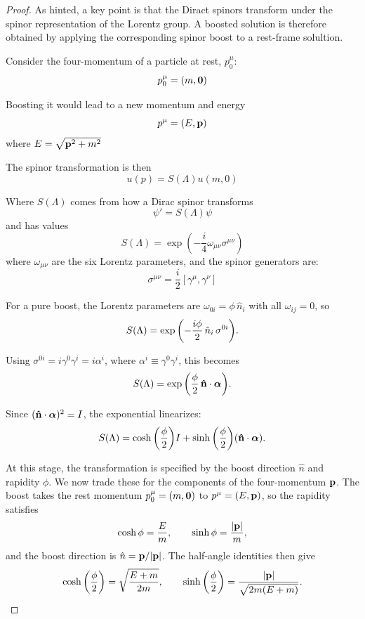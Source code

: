 \documentclass[12pt,a4paper]{article}
\begin{document}
	\begin{solution_pset}
		\begin{proof}
			\nocite{flores2026}
			As hinted, a key point is that the Diract spinors 
			transform under the spinor representation of the Lorentz
			group. A boosted solution is therefore obtained by applying 
			the corresponding spinor boost to a rest-frame solultion.

			Consider the four-momentum of a particle at rest, $p_0^\mu$:
			\begin{equation}
				\label{eq:4p-rest}
				p_0^\mu = (m,\vb{0})
			\end{equation}
			
			Boosting it would lead to a new momentum and energy
			\begin{equation}
				\label{eq:4p-moving}
				p^\mu = (E, \vb{p})
			\end{equation}
			where $E = \sqrt{\vb{p}^2 + m^2}$

			The spinor transformation is then 
			\begin{equation}
				\label{eq:spinor-transformation}
				u(p) = S(\Lambda) u(m,0)
			\end{equation}

			Where $S(\Lambda)$ comes from how a Dirac spinor transforms
			\[
				\psi' = S(\Lambda)\psi
			\]
			and has values 
			\[
				S(\Lambda) = \exp(
					- \frac{i}{4}\omega_{\mu\nu}\sigma^{\mu\nu} 
				)
			\]
			where $\omega_{\mu\nu}$ are the six Lorentz parameters, and the spinor generators are:
			\[
				\sigma^{\mu\nu} = \frac{i}{2}[\gamma^\mu,\gamma^\nu] 
			\]

			For a pure boost, the Lorentz parameters are
			$\omega_{0i} = \phi\,\hat{n}_i$ with all $\omega_{ij} = 0$,
			so
			\[
				S(\Lambda)
				=
				\exp\pqty{
					-\frac{i\phi}{2}\,\hat{n}_i\,\sigma^{0i}
				}.
			\]

			Using $\sigma^{0i} = i\gamma^0\gamma^i = i\alpha^i$, where
			$\alpha^i \equiv \gamma^0\gamma^i$, this becomes
			\[
				S(\Lambda)
				=
				\exp\pqty{
					\frac{\phi}{2}\,\vu{n}\cdot\vb*{\alpha}
				}.
			\]

			Since $(\vu{n}\cdot\vb*{\alpha})^2 = I$, the exponential
			linearizes:
			\[
				S(\Lambda)
				=
				\cosh\pqty{\frac{\phi}{2}}I
				+
				\sinh\pqty{\frac{\phi}{2}}
				(\vu{n}\cdot\vb*{\alpha}).
			\]

			At this stage, the transformation is specified by the boost
			direction $\hat{n}$ and rapidity $\phi$. We now trade these for
			the components of the four-momentum $\vb{p}$. The boost takes
			the rest momentum $p_0^\mu = (m,\vb{0})$ to
			$p^\mu = (E,\vb{p})$, so the rapidity satisfies
			\[
				\cosh\phi = \frac{E}{m},
				\qquad
				\sinh\phi = \frac{\abs{\vb{p}}}{m},
			\]
			and the boost direction is $\hat{n} = \vb{p}/\abs{\vb{p}}$. The
			half-angle identities then give
			\[
				\cosh\pqty{\frac{\phi}{2}}
				=
				\sqrt{\frac{E+m}{2m}},
				\qquad
				\sinh\pqty{\frac{\phi}{2}}
				=
				\frac{\abs{\vb{p}}}{\sqrt{2m(E+m)}}.
			\]


\end{proof}
\end{solution_pset}
\end{document}
